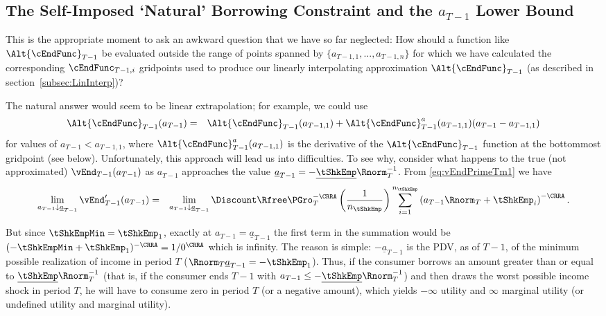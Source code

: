 \documentclass[titlepage]{\econtex}
\begin{document}
\hypertarget{The-Self-Imposed-Natural-Borrowing-Constraint-and-the-a-Lower-Bound}{}
\subsection{The Self-Imposed `Natural' Borrowing Constraint and the $a_{T-1}$ Lower Bound} \label{subsec:LiqConstrSelfImposed}


This is the appropriate moment to ask an awkward question that we have so far
neglected: How should a function like $\Alt{\cEndFunc}_{T-1}$
be evaluated outside the range of points spanned by
$\{{a}_{T-1,1},...,{a}_{T-1,n}\}$ for which we have calculated
the corresponding $\cEndFunc_{T-1,i}$ gridpoints used to produce our
linearly interpolating approximation $\Alt{\cEndFunc}_{T-1}$ (as described in section~\ref{subsec:LinInterp})?

The natural answer would seem to be linear extrapolation; for example, we could use
\begin{eqnarray}
  \Alt{\cEndFunc}_{T-1}({a}_{T-1}) &  = & \Alt{\cEndFunc}_{T-1}({a}_{T-1,1})+\Alt{\cEndFunc}_{T-1}^{{a}}({a}_{T-1,1})({a}_{T-1}-{a}_{T-1,1}) \label{eq:ExtrapLin}
\end{eqnarray}
for values of ${a}_{T-1} < {a}_{T-1,1}$, where $\Alt{\cEndFunc}_{T-1}^{{a}}({a}_{T-1,1})$ is the derivative of the $\Alt{\cEndFunc}_{T-1}$ function at the bottommost gridpoint (see below).  Unfortunately, this approach
will lead us into difficulties.  To see why, consider what
happens to the true (not approximated) $\vEnd_{T-1}({a}_{T-1})$ as
${a}_{T-1}$ approaches the value
$\underline{a}_{T-1}=-\underline{\tShkEmp}\Rnorm_{T}^{-1}$.  From
\eqref{eq:vEndPrimeTm1} we have
\begin{eqnarray}
  \lim_{{a}_{T-1} \downarrow \underline{a}_{T-1}} \vEnd_{T-1}^{\prime}({a}_{T-1}) & = &
                                                                                        \lim_{{a}_{T-1} \downarrow \underline{a}_{T-1}} \Discount \Rfree \PGro_{T}^{-\CRRA} \left(\frac{1}{n_{\tShkEmp}}\right) \sum_{i=1}^{n_{\tShkEmp}} \left( {a}_{T-1} \Rnorm_{T}+ \tShkEmp_{i}\right)^{-\CRRA}.
\end{eqnarray}

But since $\tShkEmpMin=\tShkEmp_{1}$, exactly at
${a}_{T-1}=\underline{a}_{T-1}$ the first term in the summation would
be $(-\tShkEmpMin+\tShkEmp_{1})^{-\CRRA}=1/0^{\CRRA}$ which is
infinity.  The reason is simple: $-\underline{a}_{T-1}$ is
the PDV, as of $T-1$, of the minimum possible realization of income in
period $T$ ($\Rnorm_{T}\underline{a}_{T-1} = -\tShkEmp_{1}$).  Thus,
if the consumer borrows an amount greater than or equal to
$\underline{\tShkEmp}\Rnorm_{T}^{-1}$ (that is, if the consumer ends
$T-1$ with ${a}_{T-1} \leq -\underline{\tShkEmp}\Rnorm_{T}^{-1}$) and
then draws the worst possible income shock in period $T$, he will have
to consume zero in period $T$ (or a negative amount), which yields
$-\infty$ utility and $\infty$ marginal utility (or undefined utility
and marginal utility).
\end{document}
